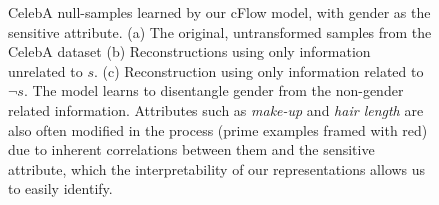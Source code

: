 \begin{figure}[tb]
{      %
      \label{fig:cflow_celeba_recon_s_suppmat}
  }
  \caption{
      CelebA null-samples learned by our \ac{cFlow} model, with gender as the sensitive attribute.
    (a) The original, untransformed samples from the CelebA dataset
    (b) Reconstructions using only information unrelated to $s$.
    (c) Reconstruction using only information related to $\neg s$.
    The model learns to disentangle gender from the non-gender related information. 
    Attributes such as \emph{make-up} and \emph{hair length} are also often modified in the process
    (prime examples framed with red) due to inherent correlations between them and the sensitive
    attribute, which the interpretability of our representations allows us to easily identify.
  }\label{fig:celeba_cflow_suppmat}
\end{figure}

